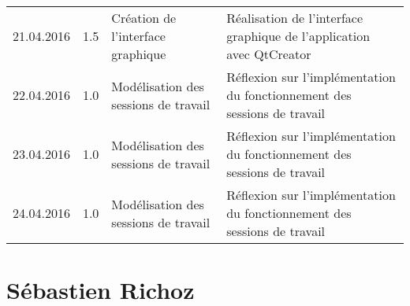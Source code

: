 \documentclass[french]{article}
\begin{document}
\begin{tabular}{p{}|p{}|p{}|p{}}
		\hline
		21.04.2016 & 1.5 & Création de l'interface graphique & Réalisation de l'interface graphique de l'application avec QtCreator\\
		22.04.2016 & 1.0 & Modélisation des sessions de travail & Réflexion sur l'implémentation du fonctionnement des sessions de travail\\
		23.04.2016 & 1.0 & Modélisation des sessions de travail & Réflexion sur l'implémentation du fonctionnement des sessions de travail\\
		24.04.2016 & 1.0 & Modélisation des sessions de travail & Réflexion sur l'implémentation du fonctionnement des sessions de travail\\
		
		
	\end{tabular}
	
	\section*{Sébastien Richoz}
\end{document}
